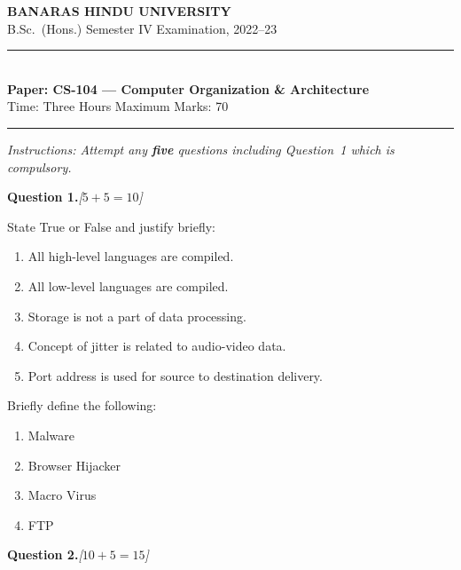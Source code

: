\documentclass[11pt,a4paper]{article}
\newcommand{\pts}[1]{\hfill   \textit{[#1]}}
\begin{document}
\begin{center}
  {\large\bfseries BANARAS HINDU UNIVERSITY}\\[2pt]
  {\normalsize B.Sc.\ (Hons.) Semester IV Examination, 2022--23}\\[6pt]
  \rule{0.8\linewidth}{0.5pt}\\[6pt]
  {\large\bfseries Paper: CS-104 --- Computer Organization \& Architecture}\\[4pt]
  {\normalsize Time: Three Hours \hfill Maximum Marks: 70}
\end{center}

\rule{\linewidth}{0.4pt}

\smallskip



\noindent   \textit{Instructions: Attempt any   \textbf{five} questions including Question~1 which is compulsory.}

\bigskip




\noindent   \textbf{Question 1.}\pts{$5+5=10$}

\begin{parts}
  \item State True or False and justify briefly:
  
\begin{enumerate}[label=(\roman*)]
    \item All high-level languages are compiled.
    \item All low-level languages are compiled.
    \item Storage is not a part of data processing.
    \item Concept of jitter is related to audio-video data.
    \item Port address is used for source to destination delivery.
  \end{enumerate}
  \item Briefly define the following:
  
\begin{enumerate}[label=(\roman*)]
    \item Malware
    \item Browser Hijacker
    \item Macro Virus
    \item FTP
  \end{enumerate}
\end{parts}

\bigskip




\noindent   \textbf{Question 2.}\pts{$10+5=15$}
\end{document}
